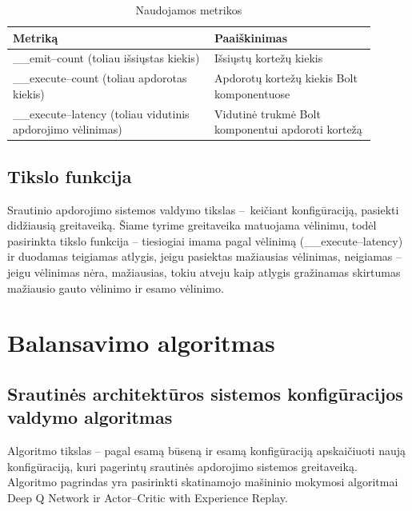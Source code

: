 \documentclass{VUMIFPSbakalaurinis}
\begin{document}
\begin{longtable}{|p{0.5\linewidth}|p{0.4\linewidth}|}
    \caption{Naudojamos metrikos}
    \label{metrics–table}\\
    \hline
    \rowcolor[HTML]{C0C0C0} 
    Metriką                                  & Paaiškinimas            \\ \hline
    \endfirsthead
    \endhead
    \_\_emit–count (toliau išsiųstas kiekis)                           & Išsiųstų kortežų kiekis                    \\ \hline
    \_\_execute–count  (toliau apdorotas kiekis)                       & Apdorotų kortežų kiekis Bolt komponentuose \\ \hline
    \_\_execute–latency  (toliau vidutinis apdorojimo vėlinimas)       & Vidutinė trukmė Bolt komponentui apdoroti kortežą                                          \\ \hline
\end{longtable}

\subsection{Tikslo funkcija}

Srautinio apdorojimo sistemos valdymo tikslas – keičiant konfigūraciją, pasiekti didžiausią greitaveiką. Šiame tyrime greitaveika matuojama vėlinimu, todėl pasirinkta tikslo funkcija – tiesiogiai imama pagal vėlinimą (\_\_execute–latency) ir duodamas teigiamas atlygis, jeigu pasiektas mažiausias vėlinimas, neigiamas – jeigu vėlinimas nėra, mažiausias, tokiu atveju kaip atlygis gražinamas skirtumas mažiausio gauto vėlinimo ir esamo vėlinimo.

\section{Balansavimo algoritmas}

\subsection{Srautinės architektūros sistemos konfigūracijos valdymo algoritmas}

Algoritmo tikslas – pagal esamą būseną ir esamą konfigūraciją apskaičiuoti naują konfigūraciją, kuri pagerintų srautinės apdorojimo sistemos greitaveiką. Algoritmo pagrindas yra pasirinkti skatinamojo mašininio mokymosi algoritmai Deep Q Network ir Actor–Critic with Experience Replay.
\end{document}
